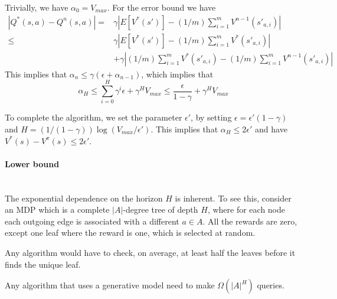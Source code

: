 Trivially, we have $\alpha_0=V_{max}$. For the error bound we have
\begin{align*}
|Q^*(s,a)-Q^n(s,a)|=&\gamma|E[V^*(s')]-(1/m)\sum_{i=1}^m
V^{n-1}(s'_{a,i})|\\
\leq &\gamma|E[V^*(s')]-(1/m)\sum_{i=1}^m V^{*}(s'_{a,i})|\\
&+\gamma|(1/m)\sum_{i=1}^m V^{*}(s'_{a,i})-(1/m)\sum_{i=1}^m
V^{n-1}(s'_{a,i})|
\end{align*}
This implies that $\alpha_n \leq \gamma(\epsilon+\alpha_{n-1})$,
which implies that
\[
\alpha_H\leq \sum_{i=0}^H \gamma^i \epsilon + \gamma^H V_{max}\leq
\frac{\epsilon}{1-\gamma}+\gamma^H V_{max}
\]

To complete the algorithm, we set the parameter $\epsilon'$, by
setting $\epsilon=\epsilon'(1-\gamma)$ and
$H=(1/(1-\gamma))\log(V_{max}/\epsilon')$. This implies that
$\alpha_H\leq 2\epsilon'$ and have $V^*(s)-V^\pi(s)\leq 2\epsilon'$.

\paragraph{Lower bound}\ \\

The exponential dependence on the horizon $H$ is inherent. To see
this, consider an MDP which is a complete $|A|$-degree tree of depth
$H$, where for each node each outgoing edge is associated with a
different $a\in A$. All the rewards are zero, except one leaf where
the reward is one, which is selected at random.

Any algorithm would have to check, on average, at least half the
leaves before it finds the unique leaf.

\begin{theorem}
Any algorithm that uses a generative model need to make
$\Omega(|A|^H)$ queries.
\end{theorem}
